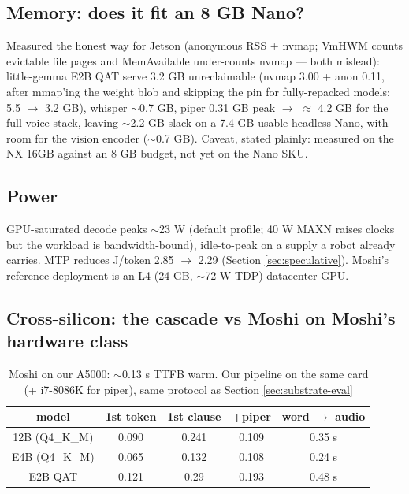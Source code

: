 \documentclass{article}
\begin{document}
\subsection{Memory: does it fit an 8 GB Nano?}
\label{sec:memory}

Measured the honest way for Jetson (anonymous RSS + nvmap; VmHWM counts evictable file pages and MemAvailable under-counts nvmap --- both mislead): little-gemma E2B QAT serve 3.2 GB unreclaimable (nvmap 3.00 + anon 0.11, after mmap'ing the weight blob and skipping the pin for fully-repacked models: 5.5 $\rightarrow$ 3.2 GB), whisper $\sim$0.7 GB, piper 0.31 GB peak $\rightarrow$ $\approx$ 4.2 GB for the full voice stack, leaving $\sim$2.2 GB slack on a 7.4 GB-usable headless Nano, with room for the vision encoder ($\sim$0.7 GB). Caveat, stated plainly: measured on the NX 16GB against an 8 GB budget, not yet on the Nano SKU.

\subsection{Power}

GPU-saturated decode peaks $\sim$23 W (default profile; 40 W MAXN raises clocks but the workload is bandwidth-bound), idle-to-peak on a supply a robot already carries. MTP reduces J/token 2.85 $\rightarrow$ 2.29 (Section \ref{sec:speculative}). Moshi's reference deployment is an L4 (24 GB, $\sim$72 W TDP) datacenter GPU.

\subsection{Cross-silicon: the cascade vs Moshi on Moshi's hardware class}
\label{sec:crosssilicon}

\begin{table}[H]
	\centering
	\small
	\begin{tabular}{ccccc}
		\toprule
		model  &  1st token & 1st clause & +piper & word $\rightarrow$ audio \\
		\midrule
		12B (Q4\_K\_M) &  0.090& 0.241 & 0.109&0.35 s\\
		E4B (Q4\_K\_M) & 0.065 & 0.132 & 0.108&0.24 s\\
		E2B QAT & 0.121& 0.29 & 0.193 	&0.48 s\\
		\bottomrule
	\end{tabular}
	\caption{Moshi on our A5000: $\sim$0.13 s TTFB warm. Our pipeline on the same card (+ i7-8086K for piper), same protocol as Section \ref{sec:substrate-eval}}
	\label{tab:pipeline}
\end{table}
\end{document}
